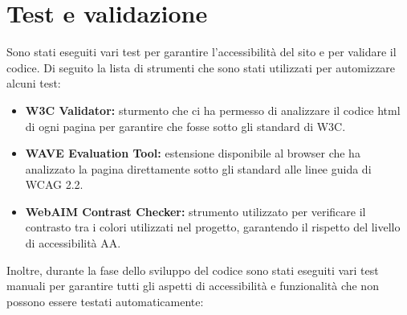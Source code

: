 \documentclass[a4paper,10pt]{article}
\begin{document}
	\section{Test e validazione}
	Sono stati eseguiti vari test per garantire l'accessibilità del sito e per validare il codice. Di seguito la lista di strumenti che sono stati utilizzati per automizzare alcuni test:
	\begin{itemize}
		\item \textbf{W3C Validator:} sturmento che ci ha permesso di analizzare il codice html di ogni pagina per garantire che fosse sotto gli standard di W3C.
		\item \textbf{WAVE Evaluation Tool:} estensione disponibile al browser che ha analizzato la pagina direttamente sotto gli standard alle linee guida di WCAG 2.2.
		\item \textbf{WebAIM Contrast Checker:} strumento utilizzato per verificare il contrasto tra i colori utilizzati nel progetto, garantendo il rispetto del livello di accessibilità AA.
	\end{itemize}
	Inoltre, durante la fase dello sviluppo del codice sono stati eseguiti vari test manuali per garantire tutti gli aspetti di accessibilità e funzionalità che non possono essere testati automaticamente:
\end{document}
